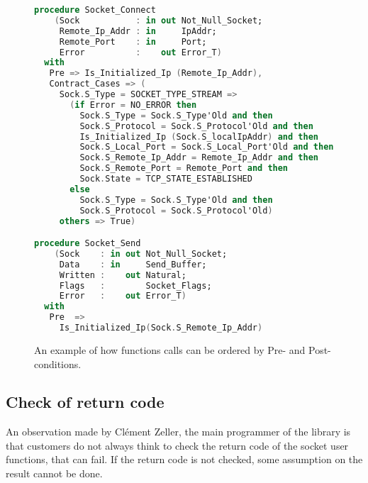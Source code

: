 \documentclass[a4paper, 10pt]{article}
\begin{document}
    \begin{figure}
        \begin{lstlisting}[language=Ada]
procedure Socket_Connect
    (Sock           : in out Not_Null_Socket;
     Remote_Ip_Addr : in     IpAddr;
     Remote_Port    : in     Port;
     Error          :    out Error_T)
  with
   Pre => Is_Initialized_Ip (Remote_Ip_Addr),
   Contract_Cases => (
     Sock.S_Type = SOCKET_TYPE_STREAM =>
       (if Error = NO_ERROR then
         Sock.S_Type = Sock.S_Type'Old and then
         Sock.S_Protocol = Sock.S_Protocol'Old and then
         Is_Initialized_Ip (Sock.S_localIpAddr) and then
         Sock.S_Local_Port = Sock.S_Local_Port'Old and then
         Sock.S_Remote_Ip_Addr = Remote_Ip_Addr and then
         Sock.S_Remote_Port = Remote_Port and then
         Sock.State = TCP_STATE_ESTABLISHED
       else
         Sock.S_Type = Sock.S_Type'Old and then
         Sock.S_Protocol = Sock.S_Protocol'Old)
     others => True)

procedure Socket_Send
    (Sock    : in out Not_Null_Socket;
     Data    : in     Send_Buffer;
     Written :    out Natural;
     Flags   :        Socket_Flags;
     Error   :    out Error_T)
  with
   Pre  =>
     Is_Initialized_Ip(Sock.S_Remote_Ip_Addr)
        \end{lstlisting}
        \caption{An example of how functions calls can be ordered by Pre- and Post-conditions.}
        \label{code:FunOrdered}
    \end{figure}

    \subsection{Check of return code}

    An observation made by Clément Zeller, the main programmer of the library is that customers
    do not always think to check the return code of the socket user functions, that can fail.
    If the return code is not checked, some assumption on the result cannot be done.
\end{document}
